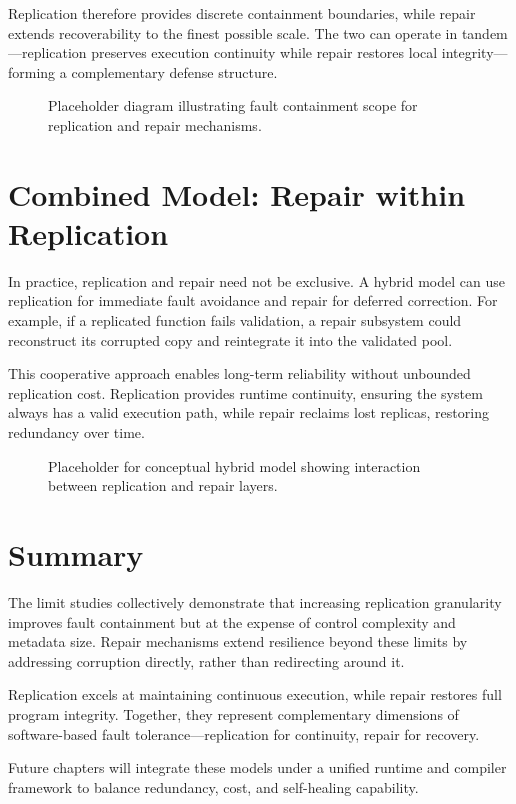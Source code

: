 Replication therefore provides discrete containment boundaries, while repair
extends recoverability to the finest possible scale.
The two can operate in tandem—replication preserves execution continuity while
repair restores local integrity—forming a complementary defense structure.

\begin{figure}[t]
  \centering
  \caption{Placeholder diagram illustrating fault containment scope for replication and repair mechanisms.}
  \label{fig:limit-containment}
\end{figure}

\section*{Combined Model: Repair within Replication}
In practice, replication and repair need not be exclusive.  
A hybrid model can use replication for immediate fault avoidance and repair for
deferred correction.  For example, if a replicated function fails validation, a
repair subsystem could reconstruct its corrupted copy and reintegrate it into
the validated pool.

This cooperative approach enables long-term reliability without unbounded
replication cost.  Replication provides runtime continuity, ensuring the system
always has a valid execution path, while repair reclaims lost replicas,
restoring redundancy over time.

\begin{figure}[t]
  \centering
  \caption{Placeholder for conceptual hybrid model showing interaction between replication and repair layers.}
  \label{fig:limit-hybrid}
\end{figure}

\section*{Summary}
The limit studies collectively demonstrate that increasing replication
granularity improves fault containment but at the expense of control complexity
and metadata size.  Repair mechanisms extend resilience beyond these limits by
addressing corruption directly, rather than redirecting around it.

Replication excels at maintaining continuous execution, while repair restores
full program integrity.  Together, they represent complementary dimensions of
software-based fault tolerance—replication for continuity, repair for recovery.

Future chapters will integrate these models under a unified runtime and compiler
framework to balance redundancy, cost, and self-healing capability.